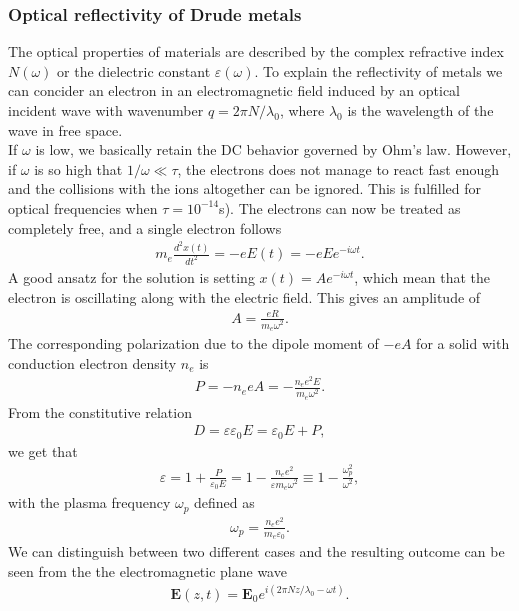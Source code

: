 \subsubsection{Optical reflectivity of Drude metals}
The optical properties of materials are described by the complex refractive index $N(\omega)$ or 
the dielectric constant $\varepsilon(\omega)$. 
To explain the reflectivity of metals we can concider an electron in an electromagnetic 
field induced by an optical incident wave with wavenumber $q = 2\pi N/\lambda_0$, where 
$\lambda_0$ is the wavelength of the wave in free space.\\
If $\omega$ is low, we basically retain the DC behavior governed by Ohm's law.
However, if $\omega$ is so high that $1/\omega \ll \tau$, 
the electrons does not manage to react fast enough and the collisions with 
the ions altogether can be ignored. This is fulfilled for optical frequencies when $\tau=10^{-14}$s). 
The electrons can now be treated as completely free, and a single electron follows
\begin{align}
   m_e \frac{d^2x(t)}{dt^2} = -e E(t) = -e E e^{-i \omega t}.
   \label{freeElectronGas}
\end{align}
A good ansatz for the solution is setting $x(t) = Ae^{-i \omega t}$, which mean that 
the electron is oscillating along with the electric field. This gives an amplitude of
\begin{align}
   A = \frac{eR}{m_e \omega^2}.
\end{align}
The corresponding polarization due to the dipole moment of $-eA$ for a solid with conduction electron
density $n_e$ is
\begin{align}
   P = -n_e eA = -\frac{n_e e^2E}{m_e \omega^2}.
\end{align}
From the constitutive relation
\begin{align}
   D = \varepsilon \varepsilon_0 E = \varepsilon_0 E + P,
\end{align}
we get that 
\begin{align}
   \varepsilon = 1 + \frac{P}{\varepsilon_0 E} = 1 - \frac{n_e e^2}{\varepsilon m_e \omega^2}
   \equiv 1 - \frac{\omega_p^2}{\omega^2},
\end{align}
with the plasma frequency $\omega_p$ defined as
\begin{align}
   \omega_p = \frac{n_e e^2}{m_e\varepsilon_0}.
\end{align}
We can distinguish between two different cases and the resulting outcome can
be seen from the the electromagnetic plane wave
\begin{align}
   \boldsymbol E (z,t) = \boldsymbol E_0 e^{i(2\pi N z/ \lambda_0 - \omega t)}.
\end{align}
